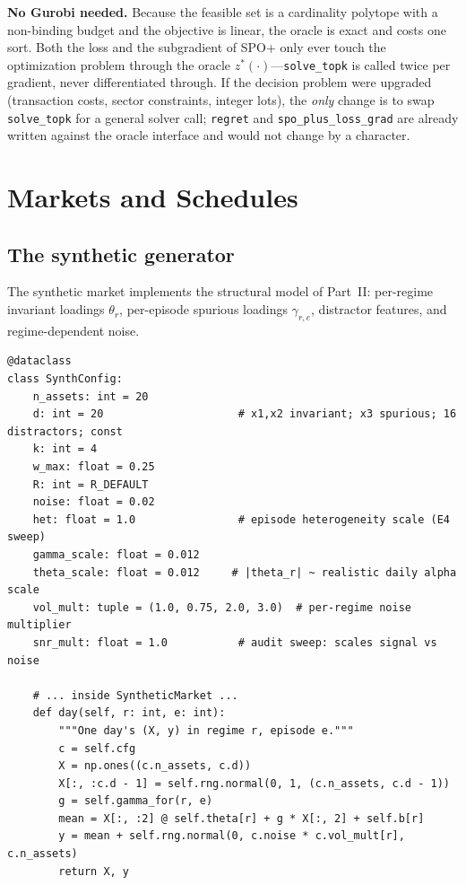 \begin{keypoint}
\textbf{No Gurobi needed.} Because the feasible set is a cardinality
polytope with a non-binding budget and the objective is linear, the oracle
is exact and costs one sort. Both the loss and the subgradient of SPO+ only
ever touch the optimization problem through the oracle
$z^*(\cdot)$---\texttt{solve\_topk} is called twice per gradient, never
differentiated through. If the decision problem were upgraded (transaction
costs, sector constraints, integer lots), the \emph{only} change is to swap
\texttt{solve\_topk} for a general solver call; \texttt{regret} and
\texttt{spo\_plus\_loss\_grad} are already written against the oracle
interface and would not change by a character.
\end{keypoint}


\section{Markets and Schedules}
\label{sec:dd6-markets}

\subsection{The synthetic generator}
\label{sec:dd6-synth}

The synthetic market implements the structural model of Part~II: per-regime
invariant loadings $\theta_r$, per-episode spurious loadings
$\gamma_{r,e}$, distractor features, and regime-dependent noise.

\begin{lstlisting}[caption={\texttt{SynthConfig} and the day generator (\texttt{risp.py}).},label={lst:dd6-synth}]
@dataclass
class SynthConfig:
    n_assets: int = 20
    d: int = 20                     # x1,x2 invariant; x3 spurious; 16 distractors; const
    k: int = 4
    w_max: float = 0.25
    R: int = R_DEFAULT
    noise: float = 0.02
    het: float = 1.0                # episode heterogeneity scale (E4 sweep)
    gamma_scale: float = 0.012
    theta_scale: float = 0.012     # |theta_r| ~ realistic daily alpha scale
    vol_mult: tuple = (1.0, 0.75, 2.0, 3.0)  # per-regime noise multiplier
    snr_mult: float = 1.0           # audit sweep: scales signal vs noise

    # ... inside SyntheticMarket ...
    def day(self, r: int, e: int):
        """One day's (X, y) in regime r, episode e."""
        c = self.cfg
        X = np.ones((c.n_assets, c.d))
        X[:, :c.d - 1] = self.rng.normal(0, 1, (c.n_assets, c.d - 1))
        g = self.gamma_for(r, e)
        mean = X[:, :2] @ self.theta[r] + g * X[:, 2] + self.b[r]
        y = mean + self.rng.normal(0, c.noise * c.vol_mult[r], c.n_assets)
        return X, y
\end{lstlisting}

